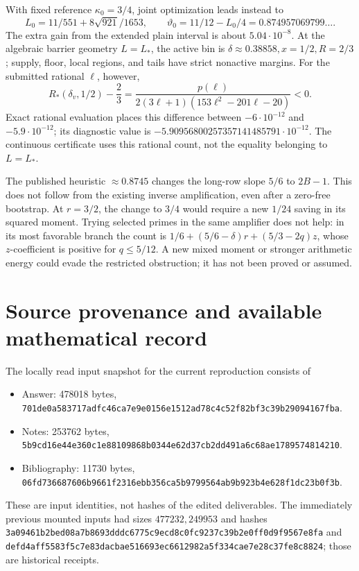 \documentclass[12pt]{article}
\begin{document}
With fixed reference \(\kappa_0=3/4\), joint optimization leads
instead to
\[
 L_0=11/551+8\sqrt{921}/1653,\qquad
 \vartheta_0=11/12-L_0/4=0.874957069799\ldots .
\]
The extra gain from the extended plain interval is about
\(5.04\cdot10^{-8}\).
At the algebraic barrier geometry \(L=L_*\), the active bin is
\(\delta\approx0.38858,x=1/2,R=2/3\);
supply, floor, local regions, and tails have strict nonactive margins.
For the submitted rational \(\ell\), however,
\[
 R_*(\delta_v,1/2)-\frac23
 =\frac{p(\ell)}
 {2(3\ell+1)(153\ell^2-201\ell-20)}<0.
\]
Exact rational evaluation places this difference between
\(-6\cdot10^{-12}\) and \(-5.9\cdot10^{-12}\);
its diagnostic value is \(-5.90956800257357141485791\cdot10^{-12}\).
The continuous certificate uses this rational count, not the
equality belonging to \(L=L_*\).

The published heuristic \(\approx0.8745\) changes the long-row
slope \(5/6\) to \(2B-1\).  This does not follow from the
existing inverse amplification, even after a zero-free bootstrap.
At \(r=3/2\), the change to \(3/4\) would require a new
\(1/24\) saving in its squared moment.
Trying selected primes in the same amplifier does not help:
in its most favorable branch the count is
\(1/6+(5/6-\delta)r+(5/3-2q)z\), whose \(z\)-coefficient
is positive for \(q\le5/12\).
A new mixed moment or stronger arithmetic energy could evade the
restricted obstruction; it has not been proved or assumed.

\section{Source provenance and available mathematical record}

The locally read input snapshot for the current reproduction consists of
\begin{itemize}
\item Answer: 478018 bytes,
\nolinkurl{701de0a583717adfc46ca7e9e0156e1512ad78c4c52f82bf3c39b29094167fba}.
\item Notes: 253762 bytes,
\nolinkurl{5b9cd16e44e360c1e88109868b0344e62d37cb2dd491a6c68ae1789574814210}.
\item Bibliography: 11730 bytes,
\nolinkurl{06fd736687606b9661f2316ebb356ca5b9799564ab9b923b4e628f1dc23b0f3b}.
\end{itemize}
These are input identities, not hashes of the edited deliverables.
The immediately previous mounted inputs had sizes \(477232,249953\)
and hashes
\nolinkurl{3a09461b2bed08a7b8693dddc6775c9ecd8c0fc9237c39b2e0ff0d9f9567e8fa}
and
\nolinkurl{defd4aff5583f5c7e83dacbae516693ec6612982a5f334cae7e28c37fe8c8824};
those are historical receipts.
\end{document}
